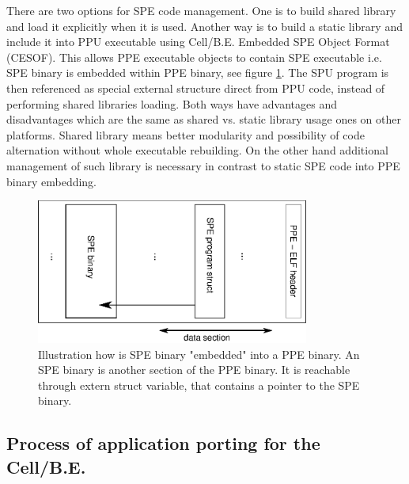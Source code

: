 \par
There are two options for SPE code management.
One is to build shared library and load it explicitly when it is used.
Another way is to build a static library and include it into PPU executable using \mbox{Cell/B.E.} Embedded SPE Object Format (CESOF).
This allows PPE executable objects to contain SPE executable i.e. SPE binary is embedded within PPE binary, see figure \ref{fg:SPEEmbedding}.
The SPU program is then referenced as special external structure direct from PPU code, instead of performing shared libraries loading.
Both ways have advantages and disadvantages which are the same as shared vs. static library usage ones on other platforms.
Shared library means better modularity and possibility of code alternation without whole executable rebuilding.
On the other hand additional management of such library is necessary in contrast to static SPE code into PPE binary embedding.


\begin{figure}
    \centering
    \includegraphics[width=0.8\textwidth]{data/SPEEmbedding}
    \caption[SPE binary embedding]{Illustration how is SPE binary "embedded" into a PPE binary.
An SPE binary is another section of the PPE binary.
It is reachable through extern struct variable, that contains a pointer to the SPE binary.}
    \label{fg:SPEEmbedding}
\end{figure}



\subsection {Process of application porting for the \mbox{Cell/B.E.}}
\label{sect:portingProcess}

